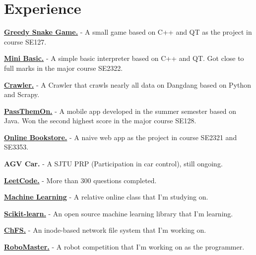 \documentclass[]{deedy-resume-openfont}
\begin{document}
\begin{minipage}[t]{0.66\textwidth} 


\section{Experience}
\vspace{\topsep} %
\begin{tightemize}
\item \href{https://github.com/WilliamX1/SJTU-SE/tree/main/SEP/project-snake}{\textbf{Greedy Snake Game.}} - A small game based on C++ and QT as the project in course SE127.
\item \href{https://github.com/WilliamX1/SJTU-SE/tree/main/DS/Mini-Basic-v2}{\textbf{Mini Basic.}} - A simple basic interpreter based on C++ and QT. Got close to full marks in the major course SE2322.
\item \href{https://github.com/WilliamX1/spider-dangdang}{\textbf{Crawler.}} - A Crawler that crawls nearly all data on Dangdang based on Python and Scrapy.
\item \href{https://github.com/WilliamX1/passthemon}{\textbf{PassThemOn.}} - A mobile app developed in the summer semester based on Java. Won the second highest score in the major course SE128.
\item \href{https://github.com/WilliamX1/bookstore}{\textbf{Online Bookstore.}} - A naive web app as the project in course SE2321 and SE3353.
\item \textbf{AGV Car.} - A SJTU PRP (Participation in car control), still ongoing.
\item \href{https://github.com/WilliamX1/leetcode}{\textbf{LeetCode.}} - More than 300 questions completed.
\end{tightemize}
\sectionsep

\vspace{\topsep} %
\begin{tightemize}
\item \href{https://www.coursera.org/learn/machine-learning}{\textbf{Machine Learning}} - A relative online class that I'm studying on.
\item \href{https://scikit-learn.org/stable/getting_started.html}{\textbf{Scikit-learn.}} - An open source machine learning library that I'm learning.
\item \href{https://ipads.se.sjtu.edu.cn/courses/cse/labs/lab1.html}{\textbf{ChFS.}} - An inode-based network file system that I'm working on.
\item \href{https://github.com/WilliamX1/RM2022-Cypher}{\textbf{RoboMaster.}} - A robot competition that I'm working on as the programmer.  
\end{tightemize}
\sectionsep


\end{minipage}
\end{document}

